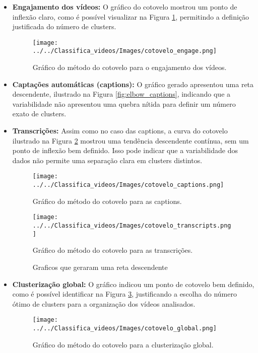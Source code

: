 \documentclass[manuscript,screen,review]{acmart}
\begin{document}
\begin{itemize}
    \item \textbf{Engajamento dos vídeos:} O gráfico do cotovelo mostrou um ponto de inflexão claro, como é possível visualizar na Figura \ref{fig:elbow_engajamento}, permitindo a definição justificada do número de clusters.
    
    \begin{figure}[ht]
        \centering
        \texttt{[image: ../../Classifica\_videos/Images/cotovelo\_engage.png]}
        \caption{Gráfico do método do cotovelo para o engajamento dos vídeos.}
        \label{fig:elbow_engajamento}
    \end{figure}

    \item \textbf{Captações automáticas (captions):} O gráfico gerado apresentou uma reta descendente, ilustrado na Figura \ref{fig:elbow_captions}, indicando que a variabilidade não apresentou uma quebra nítida para definir um número exato de clusters.
    
    \item \textbf{Transcrições:} Assim como no caso das captions, a curva do cotovelo ilustrado na Figura \ref{fig:elbow_transcripts} mostrou uma tendência descendente contínua, sem um ponto de inflexão bem definido. Isso pode indicar que a variabilidade dos dados não permite uma separação clara em clusters distintos.
    
    \begin{figure}
        \centering
        \begin{minipage}{0.45\textwidth}
            \centering
            \texttt{[image: ../../Classifica\_videos/Images/cotovelo\_captions.png]}
            \caption{Gráfico do método do cotovelo para as captions.}
            \label{fig:elbow_captions}
        \end{minipage}
        \hfill
        \begin{minipage}{0.45\textwidth}
            \centering
            \texttt{[image: ../../Classifica\_videos/Images/cotovelo\_transcripts.png]}
            \caption{Gráfico do método do cotovelo para as transcrições.}
            \label{fig:elbow_transcripts}
        \end{minipage}
        \caption{Graficos que geraram uma reta descendente}
    \end{figure}

    \item \textbf{Clusterização global:} O gráfico indicou um ponto de cotovelo bem definido, como é possível identificar na Figura \ref{fig:elbow_global}, justificando a escolha do número ótimo de clusters para a organização dos vídeos analisados.
    
    \begin{figure}
        \centering
        \texttt{[image: ../../Classifica\_videos/Images/cotovelo\_global.png]}
        \caption{Gráfico do método do cotovelo para a clusterização global.}
        \label{fig:elbow_global}
    \end{figure}
\end{itemize}
\end{document}
